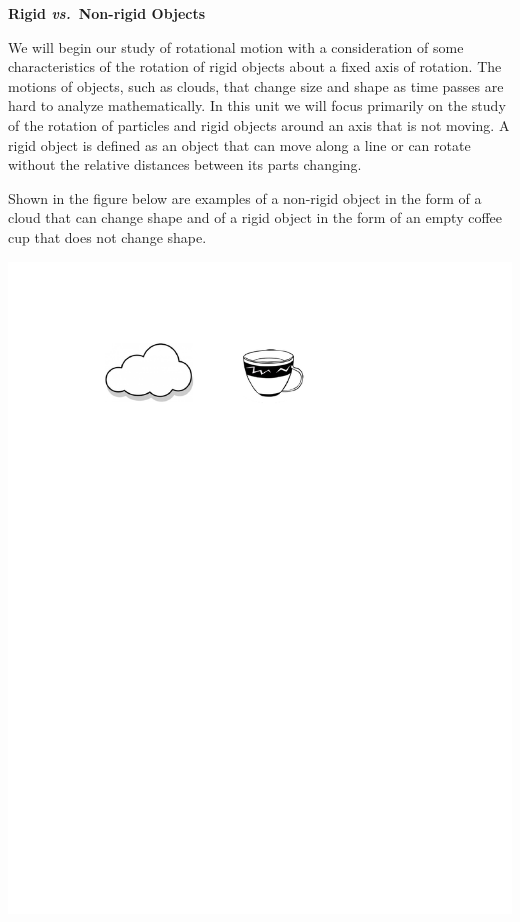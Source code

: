 \textbf{Rigid \textit{vs.}~Non-rigid Objects} 

We will begin our study of rotational motion with a consideration of some characteristics
of the rotation of rigid objects about a fixed axis of rotation. The motions
of objects, such as clouds, that change size and shape as time passes are hard
to analyze mathematically. In this unit we will focus primarily on the study
of the rotation of particles and rigid objects around an axis that is not moving.
A rigid object is defined as an object that can move along a line or can rotate
without the relative distances between its parts changing. 

Shown in the figure below are examples of a non-rigid object in the form of
a cloud that can change shape and of a rigid object in the form of an empty
coffee cup that does not change shape.

\vspace{0.3cm}
{\par\centering \includegraphics{rotation/cloud_and_cup.pdf} \par}
\vspace{0.3cm}

